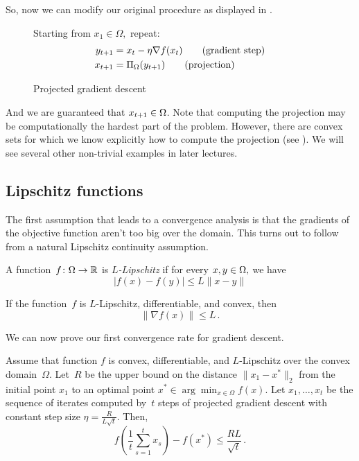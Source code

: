 So, now we can modify our original procedure as displayed in
.
\begin{figure}[h]
\begin{center}
\begin{boxedminipage}{0.75\textwidth}
Starting from $x_1\in\Omega,$ repeat:
\begin{align*}
y_{t+1} &= x_t - \eta \nabla f(x_t) \tag{gradient step} \\
x_{t+1} &= \Pi_{\Omega}(y_{t+1}) \tag{projection}
\end{align*}
\end{boxedminipage}
\end{center}
\caption{Projected gradient descent}
\end{figure}

And we are guaranteed that $x_{t+1}\in\Omega$. Note that computing the
projection may be computationally the hardest part of the problem.
However, there are convex sets for which we know explicitly how to
compute the projection (see ). We will see several
other non-trivial examples in later lectures.

\subsection{Lipschitz functions}

The first assumption that leads to a convergence analysis is that the gradients
of the objective function aren't too big over the domain. This turns out to
follow from a natural Lipschitz continuity assumption.

\begin{definition}[$L$-Lipschitz]
A function~$f\colon\Omega\to\mathbb{R}$ is \emph{$L$-Lipschitz} if for every
$x,y\in\Omega,$ we have
\[
|f(x) - f(y)| \leq L \|x - y\|
\]
\end{definition}

\begin{fact}
If the function~$f$ is $L$-Lipschitz, differentiable, and convex, then
\[
\|\nabla f(x)\| \leq L\,.
\]
\end{fact}

We can now prove our first convergence rate for gradient descent.

\begin{theorem}
Assume that function $f$ is convex, differentiable, 
and $L$-Lipschitz over the convex domain~$\Omega$. 
Let~$R$ be the upper bound on the distance $\lVert x_1 - x^* \rVert_2$
from the initial point $x_1$ to an optimal point $x^* \in\arg\min_{x \in \Omega} f(x)$.
Let $x_1,\dots,x_t$ be the sequence of iterates computed by~$t$ steps of
projected gradient descent with constant 
step size
$\eta=\frac{R}{L\sqrt{t}}.$
Then, 
\[
f\left(\frac{1}{t}\sum_{s=1}^t x_s\right) - f\left(x^*\right) 
\leq \frac{RL}{\sqrt{t}}\,.
\]
\end{theorem}

